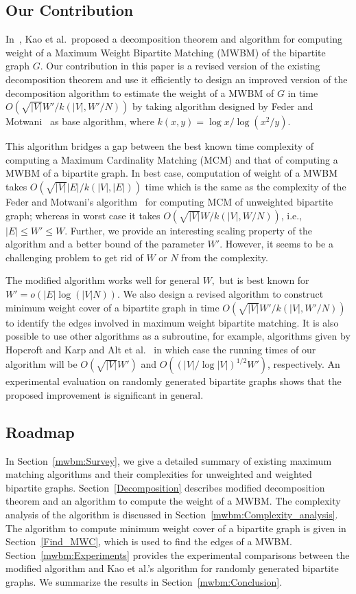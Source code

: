 \documentclass[runningheads,a4paper]{llncs}
\begin{document}
\subsection{Our Contribution}
In~\cite{kao99,kao02}, Kao et al.\ proposed a decomposition theorem and algorithm for computing weight of a Maximum Weight Bipartite Matching (MWBM) of the bipartite graph $G$.
Our contribution in this paper is a revised version of the existing decomposition theorem
and use it efficiently to design an improved version of the decomposition algorithm to estimate the weight of a MWBM of $G$ in time
$O(\sqrt{|V|}W'/k(|V|,W'/{N}))$ by taking algorithm designed by Feder and
Motwani~\cite{feder95} as base algorithm, where
$k(x,y)=\log x /\log(x^2/y)$. 


This algorithm bridges a gap between the best known time complexity of computing a Maximum Cardinality Matching (MCM) and that of computing a MWBM of a bipartite graph.
In best case, computation of weight of a MWBM takes 
$O(\sqrt{|V|}|E|/k(|V|,|E|))$ time which is the same as the complexity of the Feder and Motwani's algorithm~\cite{feder95} for computing MCM of unweighted bipartite graph;  whereas
in worst case it takes $O(\sqrt{|V|}W/k(|V|,W/{N}))$, i.e.,\ $|E| \leq W' \leq W$. 
Further, we provide an interesting scaling property of the algorithm and a better bound of the parameter $W'$.
However, it seems to be a challenging problem to get rid of $W$ or $N$ from the complexity.



The modified algorithm works well for general $W,$ but is best known for
$W'=o(|E| \log(|V| N))$. We also design a revised algorithm to construct
minimum weight cover of a bipartite graph in time  
$O(\sqrt{|V|}W'/k(|V|,W'/{N}))$
to identify the edges involved in maximum weight bipartite matching.
It is also possible to use other algorithms as a subroutine,
for example, algorithms given by Hopcroft and Karp \cite{hopcroft73} and
Alt et al.~\cite{alt91} in which case the running times of our algorithm will be $O(\sqrt{|V|}W')$ and 
$O((|V|/ \log |V|)^{1/2}W')$, respectively.
An experimental evaluation on randomly generated bipartite
graphs shows that the proposed improvement is significant in general.
\subsection{Roadmap}
In Section~\ref{mwbm:Survey},
we give a detailed summary of existing maximum matching algorithms and
their complexities for unweighted and weighted bipartite graphs.
Section~\ref{Decomposition} describes modified decomposition theorem and an
algorithm to compute the weight of a MWBM. The complexity analysis of the
algorithm is discussed in Section~\ref{mwbm:Complexity_analysis}. The algorithm to compute minimum weight cover of a bipartite graph is given in Section~\ref{Find_MWC}, which is used to find the edges of a MWBM. 
Section~\ref{mwbm:Experiments} provides the experimental comparisons between the modified algorithm and Kao et al.'s algorithm for randomly generated bipartite graphs.
We summarize the results in Section~\ref{mwbm:Conclusion}.
\end{document}

